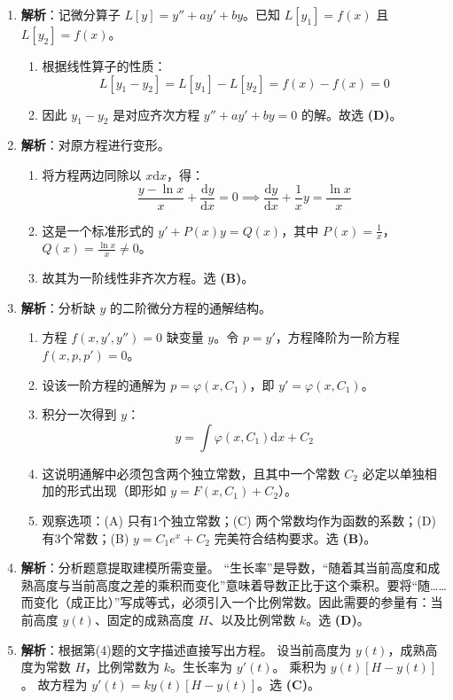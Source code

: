 \documentclass[lang=cn,11pt]{elegantbook}
\begin{document}
\begin{solution}
\begin{enumerate}
    \item[(1)] \textbf{解析}：记微分算子 $L[y] = y''+a y'+b y$。已知 $L[y_1]=f(x)$ 且 $L[y_2]=f(x)$。
    \begin{enumerate}
        \item 根据线性算子的性质：
        \[
        L[y_1-y_2] = L[y_1] - L[y_2] = f(x) - f(x) = 0
        \]
        \item 因此 $y_1-y_2$ 是对应齐次方程 $y''+a y'+b y=0$ 的解。故选 \textbf{(D)}。
    \end{enumerate}
    
    \item[(2)] \textbf{解析}：对原方程进行变形。
    \begin{enumerate}
        \item 将方程两边同除以 $x \mathrm{d}x$，得：
        \[
        \frac{y-\ln x}{x} + \frac{\mathrm{d}y}{\mathrm{d}x} = 0 \implies \frac{\mathrm{d}y}{\mathrm{d}x} + \frac{1}{x}y = \frac{\ln x}{x}
        \]
        \item 这是一个标准形式的 $y' + P(x)y = Q(x)$，其中 $P(x)=\frac{1}{x}$，$Q(x)=\frac{\ln x}{x} \neq 0$。
        \item 故其为一阶线性非齐次方程。选 \textbf{(B)}。
    \end{enumerate}
    
    \item[(3)] \textbf{解析}：分析缺 $y$ 的二阶微分方程的通解结构。
    \begin{enumerate}
        \item 方程 $f(x,y',y'')=0$ 缺变量 $y$。令 $p=y'$，方程降阶为一阶方程 $f(x,p,p')=0$。
        \item 设该一阶方程的通解为 $p = \varphi(x, C_1)$，即 $y' = \varphi(x, C_1)$。
        \item 积分一次得到 $y$：
        \[
        y = \int \varphi(x, C_1) \mathrm{d}x + C_2
        \]
        \item 这说明通解中必须包含两个独立常数，且其中一个常数 $C_2$ 必定以单独相加的形式出现（即形如 $y = F(x, C_1) + C_2$）。
        \item 观察选项：(A) 只有1个独立常数；(C) 两个常数均作为函数的系数；(D) 有3个常数；(B) $y=C_1e^x+C_2$ 完美符合结构要求。选 \textbf{(B)}。
    \end{enumerate}
    
    \item[(4)] \textbf{解析}：分析题意提取建模所需变量。
    “生长率”是导数，“随着其当前高度和成熟高度与当前高度之差的乘积而变化”意味着导数正比于这个乘积。要将“随……而变化（成正比）”写成等式，必须引入一个比例常数。因此需要的参量有：当前高度 $y(t)$、固定的成熟高度 $H$、以及比例常数 $k$。选 \textbf{(D)}。
    
    \item[(5)] \textbf{解析}：根据第(4)题的文字描述直接写出方程。
    设当前高度为 $y(t)$，成熟高度为常数 $H$，比例常数为 $k$。生长率为 $y'(t)$。
    乘积为 $y(t)[H-y(t)]$。
    故方程为 $y'(t) = k y(t) [H - y(t)]$。选 \textbf{(C)}。
\end{enumerate}
\end{solution}
\end{document}
